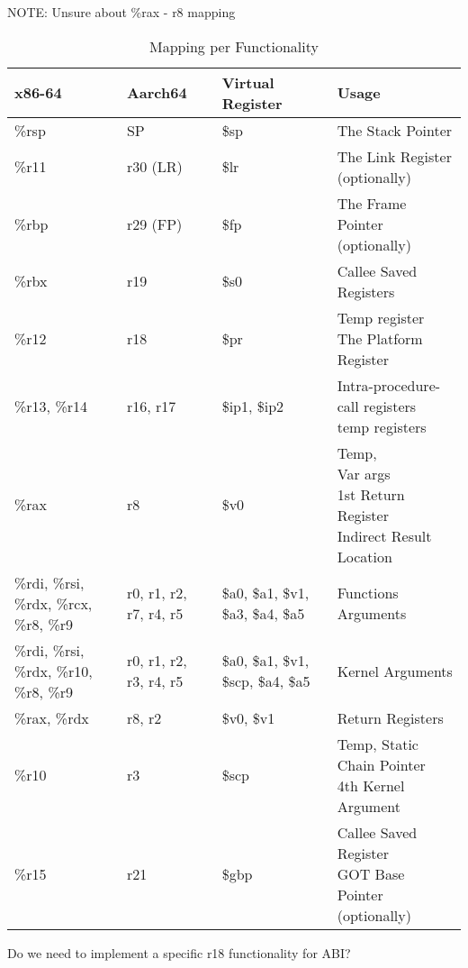 \documentclass[11pt]{article}
\begin{document}
NOTE: Unsure about \%rax - r8 mapping

\begin{table}[ht]
\caption{Mapping per Functionality}
\begin{adjustwidth}{-4.3cm}{-4.3cm}
\begin{tabular}{|l|l|l|l|}
    \hline
    \textbf{x86-64} & \textbf{Aarch64} & \textbf{Virtual Register} & \textbf{Usage} \\
    \hline
    \%rsp & SP & \$sp & The Stack Pointer \\
    \hline
    \%r11 & r30 (LR) & \$lr & The Link Register (optionally) \\
    \hline
    \%rbp & r29 (FP) & \$fp & The Frame Pointer (optionally) \\
    \hline
    \%rbx & r19 & \$s0 & Callee Saved Registers \\
    \hline
    \%r12 & r18 & \$pr & \pbox{20cm}{Temp register \\ The Platform Register} \\
    \hline
    \%r13, \%r14 & r16, r17 & \$ip1, \$ip2 & \pbox{20cm}{Intra-procedure-call registers \\ temp registers} \\
    \hline
    \%rax & r8 & \$v0 & \pbox{20cm}{Temp, \\  Var args \\ 1st Return Register \\ Indirect Result Location} \\
    \hline
    \%rdi, \%rsi, \%rdx, \%rcx, \%r8, \%r9 & r0, r1, r2, r7, r4, r5 & \$a0, \$a1, \$v1, \$a3, \$a4, \$a5 & Functions Arguments \\
    \hline
    \%rdi, \%rsi, \%rdx, \%r10, \%r8, \%r9 & r0, r1, r2, r3, r4, r5 & \$a0, \$a1, \$v1, \$scp, \$a4, \$a5 & Kernel Arguments \\
    \hline
    \%rax, \%rdx & r8, r2 & \$v0, \$v1 & Return Registers \\
    \hline
    \%r10 & r3 & \$scp & \pbox{20cm}{Temp, Static Chain Pointer \\ 4th Kernel Argument} \\
    \hline
    \%r15 & r21 & \$gbp & \pbox{20cm}{Callee Saved Register \\ GOT Base Pointer (optionally)} \\
    \hline
\end{tabular}
\end{adjustwidth}\label{tab:mappings_per_func}
\end{table}

    Do we need to implement a specific r18 functionality for ABI?
\end{document}
